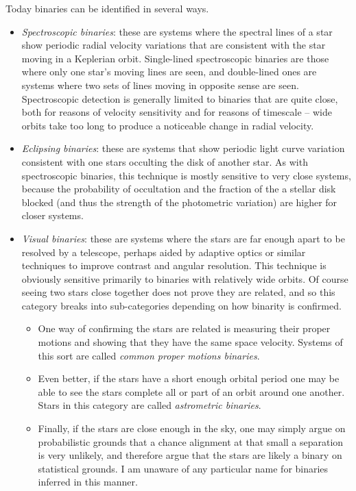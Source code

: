 Today binaries can be identified in several ways.
\begin{itemize}
\item {\it Spectroscopic binaries}: these are systems where the spectral lines of a star show periodic radial velocity variations that are consistent with the star moving in a Keplerian orbit. Single-lined spectroscopic binaries are those where only one star's moving lines are seen, and double-lined ones are systems where two sets of lines moving in opposite sense are seen. Spectroscopic detection is generally limited to binaries that are quite close, both for reasons of velocity sensitivity and for reasons of timescale -- wide orbits take too long to produce a noticeable change in radial velocity.
\item {\it Eclipsing binaries}: these are systems that show periodic light curve variation consistent with one stars occulting the disk of another star. As with spectroscopic binaries, this technique is mostly sensitive to very close systems, because the probability of occultation and the fraction of the a stellar disk blocked (and thus the strength of the photometric variation) are higher for closer systems.
\item {\it Visual binaries}: these are systems where the stars are far enough apart to be resolved by a telescope, perhaps aided by adaptive optics or similar techniques to improve contrast and angular resolution. This technique is obviously sensitive primarily to binaries with relatively wide orbits. Of course seeing two stars close together does not prove they are related, and so this category breaks into sub-categories depending on how binarity is confirmed. 
\begin{itemize}
\item One way of confirming the stars are related is measuring their proper motions and showing that they have the same space velocity. Systems of this sort are called {\it common proper motions binaries}. 
\item Even better, if the stars have a short enough orbital period one may be able to see the stars complete all or part of an orbit around one another. Stars in this category are called {\it astrometric binaries}.
\item Finally, if the stars are close enough in the sky, one may simply argue on probabilistic grounds that a chance alignment at that small a separation is very unlikely, and therefore argue that the stars are likely a binary on statistical grounds. I am unaware of any particular name for binaries inferred in this manner.
\end{itemize}
\end{itemize}

